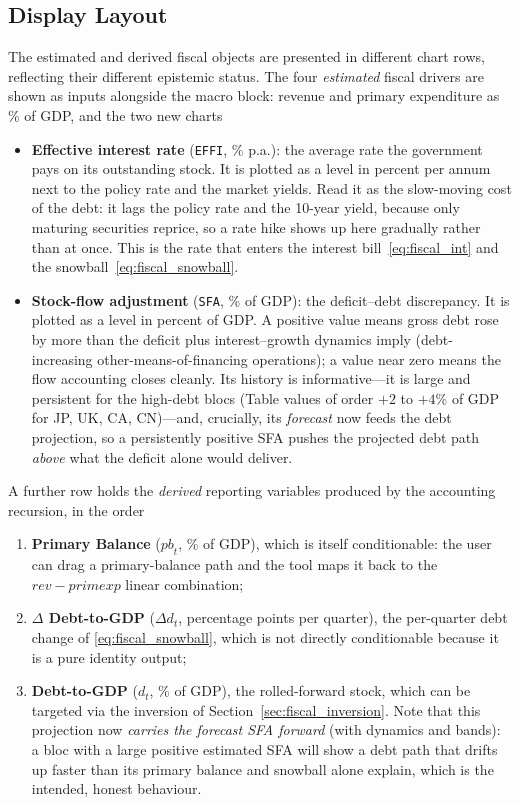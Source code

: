 \documentclass[11pt]{article}
\theoremstyle{definition}
\theoremstyle{remark}
\begin{document}
\subsection{Display Layout}\label{sec:fiscal_display}

The estimated and derived fiscal objects are presented in different
chart rows, reflecting their different epistemic status.  The four
\emph{estimated} fiscal drivers are shown as inputs alongside the macro
block: revenue and primary expenditure as \% of GDP, and the two new charts
\begin{itemize}
  \item \textbf{Effective interest rate} (\texttt{EFFI}, \% p.a.): the average
    rate the government pays on its outstanding stock. It is plotted as a level
    in percent per annum next to the policy rate and the market yields. Read it
    as the slow-moving cost of the debt: it lags the policy rate and the
    10-year yield, because only maturing securities reprice, so a rate hike
    shows up here gradually rather than at once. This is the rate that enters
    the interest bill~\eqref{eq:fiscal_int} and the snowball~\eqref{eq:fiscal_snowball}.
  \item \textbf{Stock-flow adjustment} (\texttt{SFA}, \% of GDP): the
    deficit--debt discrepancy. It is plotted as a level in percent of GDP.
    A positive value means gross debt rose by more than the deficit plus
    interest--growth dynamics imply (debt-increasing other-means-of-financing
    operations); a value near zero means the flow accounting closes cleanly.
    Its history is informative---it is large and persistent for the high-debt
    blocs (Table values of order $+2$ to $+4$\% of GDP for JP, UK, CA, CN)---and,
    crucially, its \emph{forecast} now feeds the debt projection, so a
    persistently positive SFA pushes the projected debt path \emph{above} what
    the deficit alone would deliver.
\end{itemize}
A further row holds the \emph{derived} reporting variables produced by the
accounting recursion, in the order
\begin{enumerate}[label=(\roman*)]
  \item \textbf{Primary Balance} ($\mathit{pb}_t$, \% of GDP), which is
    itself conditionable: the user can drag a primary-balance path and
    the tool maps it back to the $\mathit{rev}-\mathit{primexp}$
    linear combination;
  \item \textbf{$\Delta$ Debt-to-GDP} ($\Delta d_t$, percentage points
    per quarter), the per-quarter debt change of
    \eqref{eq:fiscal_snowball}, which is not directly conditionable
    because it is a pure identity output;
  \item \textbf{Debt-to-GDP} ($d_t$, \% of GDP), the rolled-forward
    stock, which can be targeted via the inversion of
    Section~\ref{sec:fiscal_inversion}. Note that this projection now
    \emph{carries the forecast SFA forward} (with dynamics and bands): a bloc
    with a large positive estimated SFA will show a debt path that drifts up
    faster than its primary balance and snowball alone explain, which is the
    intended, honest behaviour.
\end{enumerate}
\end{document}
